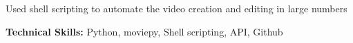 \begin{cventries}
{\begin{cvitems}
        \item {Used shell scripting to automate the video creation and editing in large numbers}
        \item {\textbf{Technical Skills:} Python, moviepy, Shell scripting, API, Github}
      \end{cvitems}
    }

\end{cventries}